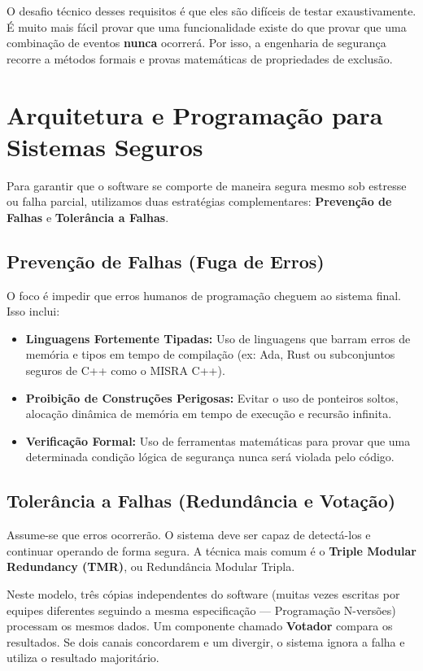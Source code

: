 \documentclass[12pt,a4paper,twoside]{report}
\begin{document}
O desafio técnico desses requisitos é que eles são difíceis de testar exaustivamente. É muito mais fácil provar que uma funcionalidade existe do que provar que uma combinação de eventos \textbf{nunca} ocorrerá. Por isso, a engenharia de segurança recorre a métodos formais e provas matemáticas de propriedades de exclusão.

\section{Arquitetura e Programação para Sistemas Seguros}

Para garantir que o software se comporte de maneira segura mesmo sob estresse ou falha parcial, utilizamos duas estratégias complementares: \textbf{Prevenção de Falhas} e \textbf{Tolerância a Falhas}.

\subsection{Prevenção de Falhas (Fuga de Erros)}
O foco é impedir que erros humanos de programação cheguem ao sistema final. Isso inclui:
\begin{itemize}
    \item \textbf{Linguagens Fortemente Tipadas:} Uso de linguagens que barram erros de memória e tipos em tempo de compilação (ex: Ada, Rust ou subconjuntos seguros de C++ como o MISRA C++).
    \item \textbf{Proibição de Construções Perigosas:} Evitar o uso de ponteiros soltos, alocação dinâmica de memória em tempo de execução e recursão infinita.
    \item \textbf{Verificação Formal:} Uso de ferramentas matemáticas para provar que uma determinada condição lógica de segurança nunca será violada pelo código.
\end{itemize}

\subsection{Tolerância a Falhas (Redundância e Votação)}
Assume-se que erros ocorrerão. O sistema deve ser capaz de detectá-los e continuar operando de forma segura. A técnica mais comum é o \textbf{Triple Modular Redundancy (TMR)}, ou Redundância Modular Tripla.

Neste modelo, três cópias independentes do software (muitas vezes escritas por equipes diferentes seguindo a mesma especificação --- Programação N-versões) processam os mesmos dados. Um componente chamado \textbf{Votador} compara os resultados. Se dois canais concordarem e um divergir, o sistema ignora a falha e utiliza o resultado majoritário.
\end{document}
